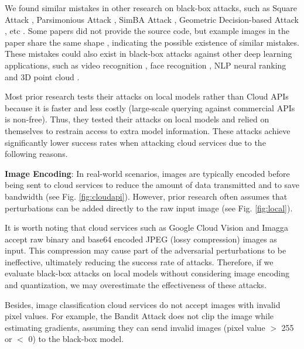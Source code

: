 We found similar mistakes in other research on black-box attacks, such as Square Attack \citep{andriushchenko2020square}, Parsimonious Attack \citep{moon2019parsimonious}, SimBA Attack \citep{guo2019simple}, Geometric Decision-based Attack \citep{rahmati2020geoda}, etc \citep{cheng2018query, cheng2019sign, chen2020rays, debenedetti2023evading}. Some papers did not provide the source code, but example images in the paper share the same shape \citep{chen2023query, bai2023query, xu2023sparse, wu2023black}, indicating the possible existence of similar mistakes. These mistakes could also exist in black-box attacks against other deep learning applications, such as video recognition \citep{jiang2019black, chen2023coreset, mu2024enhancing}, face recognition \citep{dong2019efficient, ma2023transferable}, NLP neural ranking \citep{wu2023prada, liu2022order} and 3D point cloud \citep{liu2022imperceptible, zhang20233d, tao20233dhacker}.

Most prior research tests their attacks on local models rather than Cloud APIs because it is faster and less costly (large-scale querying against commercial APIs is non-free). Thus, they tested their attacks on local models and relied on themselves to restrain access to extra model information. These attacks achieve significantly lower success rates when attacking cloud services due to the following reasons.

\textbf{Image Encoding}: In real-world scenarios, images are typically encoded before being sent to cloud services to reduce the amount of data transmitted and to save bandwidth (see Fig. \ref{fig:cloudapi}). However, prior research often assumes that perturbations can be added directly to the raw input image (see Fig. \ref{fig:local}). 

It is worth noting that cloud services such as Google Cloud Vision and Imagga accept raw binary and base64 encoded JPEG (lossy compression) images as input. This compression may cause part of the adversarial perturbations to be ineffective, ultimately reducing the success rate of attacks. Therefore, if we evaluate black-box attacks on local models without considering image encoding and quantization, we may overestimate the effectiveness of these attacks. %

Besides, image classification cloud services do not accept images with invalid pixel values. For example, the Bandit Attack does not clip the image while estimating gradients, assuming they can send invalid images (pixel value $>$ 255 or $<$ 0) to the black-box model.

